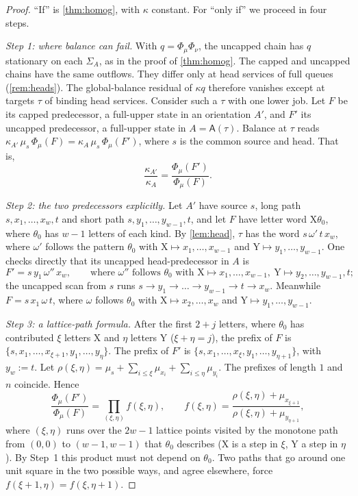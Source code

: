 \documentclass[11pt,a4paper]{article}
\theoremstyle{plain}
\theoremstyle{plain}
\newcommand{\Or}{\mathsf{A}}
\newcommand{\Sg}{\Sigma}
\begin{document}
\begin{proof}
``If'' is \cref{thm:homog}, with $\kappa$ constant. For ``only if'' we proceed in four steps.

\emph{Step 1: where balance can fail.} With $q=\Phi_\mu\Phi_\nu$, the uncapped chain has $q$ stationary on each $\Sg_A$, as in the proof of \cref{thm:homog}. The capped and uncapped chains have the same outflows. They differ only at head services of full queues (\cref{rem:heads}). The global-balance residual of $\kappa q$ therefore vanishes except at targets $\tau$ of binding head services. Consider such a $\tau$ with one lower job. Let $F$ be its capped predecessor, a full-upper state in an orientation $A'$, and $F'$ its uncapped predecessor, a full-upper state in $A=\Or(\tau)$. Balance at $\tau$ reads $\kappa_{A'}\,\mu_s\,\Phi_\mu(F)=\kappa_A\,\mu_s\,\Phi_\mu(F')$, where $s$ is the common source and head. That is,
\[
\frac{\kappa_{A'}}{\kappa_A}=\frac{\Phi_\mu(F')}{\Phi_\mu(F)}.
\]

\emph{Step 2: the two predecessors explicitly.} Let $A'$ have source $s$, long path $s,x_1,\dots,x_w,t$ and short path $s,y_1,\dots,y_{w-1},t$, and let $F$ have letter word $\mathrm X\theta_0$, where $\theta_0$ has $w-1$ letters of each kind. By \cref{lem:head}, $\tau$ has the word $s\,\omega'\,t\,x_w$, where $\omega'$ follows the pattern $\theta_0$ with $\mathrm X\mapsto x_1,\dots,x_{w-1}$ and $\mathrm Y\mapsto y_1,\dots,y_{w-1}$. One checks directly that its uncapped head-predecessor in $A$ is
\[
F' = s\,y_1\,\omega''\,x_w,\qquad\text{where }\omega''\text{ follows }\theta_0\text{ with }\mathrm X\mapsto x_1,\dots,x_{w-1},\ \mathrm Y\mapsto y_2,\dots,y_{w-1},t;
\]
the uncapped scan from $s$ runs $s\to y_1\to\dots\to y_{w-1}\to t\to x_w$. Meanwhile $F=s\,x_1\,\omega\,t$, where $\omega$ follows $\theta_0$ with $\mathrm X\mapsto x_2,\dots,x_w$ and $\mathrm Y\mapsto y_1,\dots,y_{w-1}$.

\emph{Step 3: a lattice-path formula.} After the first $2+j$ letters, where $\theta_0$ has contributed $\xi$ letters $\mathrm X$ and $\eta$ letters $\mathrm Y$ ($\xi+\eta=j$), the prefix of $F$ is $\{s,x_1,\dots,x_{\xi+1},y_1,\dots,y_\eta\}$. The prefix of $F'$ is $\{s,x_1,\dots,x_\xi,y_1,\dots,y_{\eta+1}\}$, with $y_w:=t$. Let $\rho(\xi,\eta)=\mu_s+\sum_{i\le \xi}\mu_{x_i}+\sum_{i\le \eta}\mu_{y_i}$. The prefixes of length $1$ and $n$ coincide. Hence
\[
\frac{\Phi_\mu(F')}{\Phi_\mu(F)}=\prod_{(\xi,\eta)}f(\xi,\eta),\qquad f(\xi,\eta)=\frac{\rho(\xi,\eta)+\mu_{x_{\xi+1}}}{\rho(\xi,\eta)+\mu_{y_{\eta+1}}},
\]
where $(\xi,\eta)$ runs over the $2w-1$ lattice points visited by the monotone path from $(0,0)$ to $(w-1,w-1)$ that $\theta_0$ describes ($\mathrm X$ is a step in $\xi$, $\mathrm Y$ a step in $\eta$). By Step~1 this product must not depend on $\theta_0$. Two paths that go around one unit square in the two possible ways, and agree elsewhere, force $f(\xi+1,\eta)=f(\xi,\eta+1)$.


\end{proof}
\end{document}
